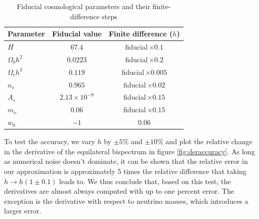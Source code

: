 \documentclass[11pt]{article} %
\begin{document}
\begin{table}[h!]
    \centering
    \begin{tabular}{lcc}
    \toprule
    Parameter & Fiducial value & Finite difference ($h$) \\
    \midrule
    $H$            & $67.4$               & fiducial\,$\times0.1$   \\
    $\Omega_b h^2$ & $0.0223$             & fiducial\,$\times0.2$   \\
    $\Omega_c h^2$ & $0.119$              & fiducial\,$\times0.005$ \\
    $n_s$          & $0.965$              & fiducial\,$\times0.02$ \\
    $A_s$          & $2.13\times10^{-9}$  & fiducial\,$\times0.15$   \\
    $m_\nu$        & $0.06$               & fiducial\,$\times0.15$   \\
    $w_0$          & $-1$                 & $0.06$                  \\
    \bottomrule
    \end{tabular}
    \caption{Fiducial cosmological parameters and their finite-difference steps}
    \label{tab:cosmo-params-diff}
\end{table}
    
    

To test the accuracy, we vary $h$ by $\pm 5\%$ and $\pm 10\%$ and plot the relative change in the derivative of the equilateral bispectrum in figure \ref{fig:deraccuracy}. As long as numerical noise doesn't dominate, it can be shown that the relative error in our approximation is approximately 5 times the relative difference that taking $h \rightarrow h(1 \pm 0.1)$ leads to. We thus conclude that, based on this test, the derivatives are almost always computed with up to one percent error. The exception is the derivative with respect to neutrino masses, which introduces a larger error. 
\end{document}
